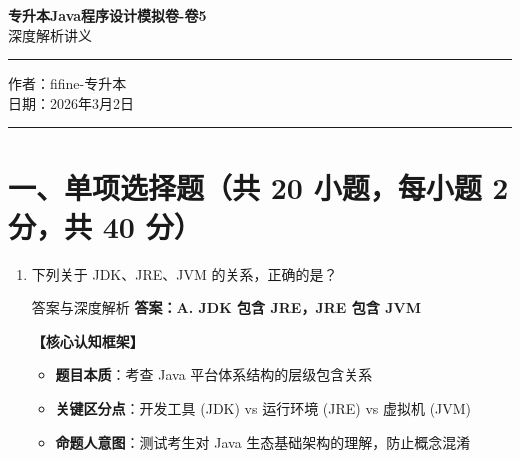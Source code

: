 ﻿\documentclass[12pt, a4paper]{ctexart}
\begin{document}
\begin{center}
	{\huge\bfseries \textcolor{myblue}{专升本Java程序设计模拟卷-卷5}}\\[0.8em]
	{\large 深度解析讲义}\\[1em]
	\hrule
	\vspace{0.8em}
	{\large 作者：fifine-专升本}\\[0.5em]
	{\large 日期：2026年3月2日}
	\vspace{1em}
	\hrule
\end{center}

\newpage
\section{一、单项选择题（共 20 小题，每小题 2 分，共 40 分）}

\begin{enumerate}[label=\arabic*., itemsep=1.5em]
	\item 下列关于 JDK、JRE、JVM 的关系，正确的是？
	      \begin{bluebox}{答案与深度解析}
		      \textbf{答案：A. JDK 包含 JRE，JRE 包含 JVM}

		      \textbf{【核心认知框架】}
		      \begin{itemize}[leftmargin=*, nosep]
			      \item \textbf{题目本质}：考查 Java 平台体系结构的层级包含关系
			      \item \textbf{关键区分点}：开发工具 (JDK) vs 运行环境 (JRE) vs 虚拟机 (JVM)
			      \item \textbf{命题人意图}：测试考生对 Java 生态基础架构的理解，防止概念混淆
		      \end{itemize}


\end{bluebox}
\end{enumerate}
\end{document}
